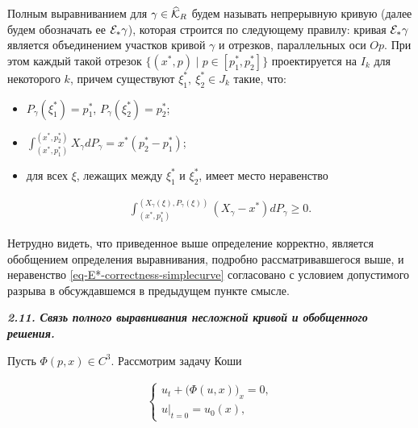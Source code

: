 \begin{definition}[12]Полным выравниванием для $\gamma\in\widehat{\cal K}_R$ будем называть непрерывную кривую (далее будем обозначать ее ${\cal E}_*\gamma$), которая строится по следующему правилу: кривая ${\cal E}_*\gamma$ является объединением участков кривой $\gamma$ и отрезков, параллельных оси $Op$. При этом каждый такой отрезок $\{(x^*,p)\mid p\in[p^*_1,p^*_2]\}$ проектируется на $I_k$ для некоторого $k$, причем существуют $\xi^*_1,~\xi^*_2\in J_k$ такие, что:



\begin{itemize}

\item[1)] $P_{\gamma}(\xi^*_1)=p^*_1$, $P_{\gamma}(\xi^*_2)=p^*_2$;

\item[2)] $\displaystyle \int _{(x^*,p^*_1)}^{(x^*,p^*_2)}X_{\gamma}dP_{\gamma}=x^*(p^*_2-p^*_1)$;

\item[3)] для всех $\xi$, лежащих между $\xi^*_1$ и $\xi^*_2$, имеет место неравенство

\begin{gather}

\int _{(x^*,p^*_1)}^{(X_{\gamma}(\xi),P_{\gamma}(\xi))}(X_{\gamma}-x^*)dP_{\gamma}\ge0.

\label{eq-E*-correctness-simplecurve}

\end{gather}

\end{itemize}

\end{definition}



\smallskip



Нетрудно видеть, что приведенное выше определение корректно, является обобщением определения выравнивания, подробно рассматривавшегося выше, и неравенство \eqref{eq-E*-correctness-simplecurve} согласовано с условием допустимого разрыва в обсуждавшемся в предыдущем пункте смысле.



\smallskip



{\bf \itshape 2.11. Связь полного выравнивания несложной кривой и обобщенного решения.}

Пусть $\Phi(p,x)\in C^3$. Рассмотрим задачу Коши

\begin{gather}

\left\{\begin{array}{l}

u_t+\bigl(\Phi(u,x)\bigr)_x=0,\\

 u\bigr|_{t=0}=u_0(x),

\end{array}\right.\label{eq-classic-conservation-2}

\end{gather}

